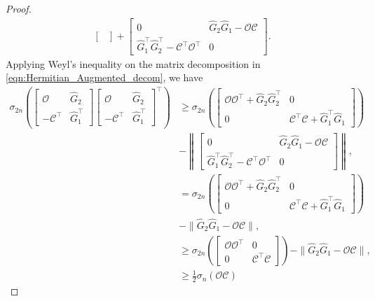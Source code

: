 \documentclass[11pt]{article}
\newcommand{\Ccal}{\mathcal{C}}
\newcommand{\Ocal}{\mathcal{O}}
\newcommand{\nn}{\nonumber}
\newcommand{\norm}[1]{\|{#1} \|}
\newcommand{\T}{\top}
\newcommand{\<}{\langle}
\renewcommand{\>}{\rangle}
\numberwithin{equation}{section}
\begin{document}
\begin{proof}
\begin{align}
\begin{bmatrix}
		\end{bmatrix}
		+
		\begin{bmatrix}
			0 &  \hat{G}_2 \hat{G}_1 - \Ocal \Ccal\\
			\hat{G}_1^{\T} \hat{G}_2^\T - \Ccal^\T\Ocal^\T & 0
		\end{bmatrix}. \label{eqn:Hermitian_Augmented_decom}
	\end{align}
	Applying Weyl's inequality on the matrix decomposition in \eqref{eqn:Hermitian_Augmented_decom}, we have
	\begin{align}
		\sigma_{2n} \left( \begin{bmatrix}
			\Ocal & \hat{G}_2 \\
			-\Ccal^\T &  \hat{G}_1^{\T}
		\end{bmatrix}
		\begin{bmatrix}
			\Ocal & \hat{G}_2 \\
			-\Ccal^\T &  \hat{G}_1^{\T}
		\end{bmatrix}^\T\right) 
		&\geq \sigma_{2n} \left(\begin{bmatrix}
			\Ocal \Ocal^\T + \hat{G}_2 \hat{G}_2^\T &  0\\
			0 & \Ccal^\T \Ccal + \hat{G}_1^\T \hat{G}_1
		\end{bmatrix}\right) \nn \\
		&- \left\|\begin{bmatrix}
			0 &  \hat{G}_2 \hat{G}_1 - \Ocal \Ccal\\
			\hat{G}_1^{\T} \hat{G}_2^\T - \Ccal^\T\Ocal^\T & 0
		\end{bmatrix}\right\|, \nn \\
		&= \sigma_{2n} \left(\begin{bmatrix}
			\Ocal \Ocal^\T + \hat{G}_2 \hat{G}_2^\T &  0\\
			0 & \Ccal^\T \Ccal + \hat{G}_1^\T \hat{G}_1
		\end{bmatrix}\right) \nn \\
		&- \norm{\hat{G}_2 \hat{G}_1 - \Ocal \Ccal}, \nn \\
		& \geq \sigma_{2n} \left(\begin{bmatrix}
			\Ocal \Ocal^\T &  0\\
			0 & \Ccal^\T \Ccal
		\end{bmatrix}\right) - \norm{\hat{G}_2 \hat{G}_1 - \Ocal \Ccal}, \nn \\
		& \geq \frac{1}{2} \sigma_{n}\left(\Ocal \Ccal\right)
		\label{eqn:eigenvalue_lowerBound}
	\end{align}

\end{proof}
\end{document}
